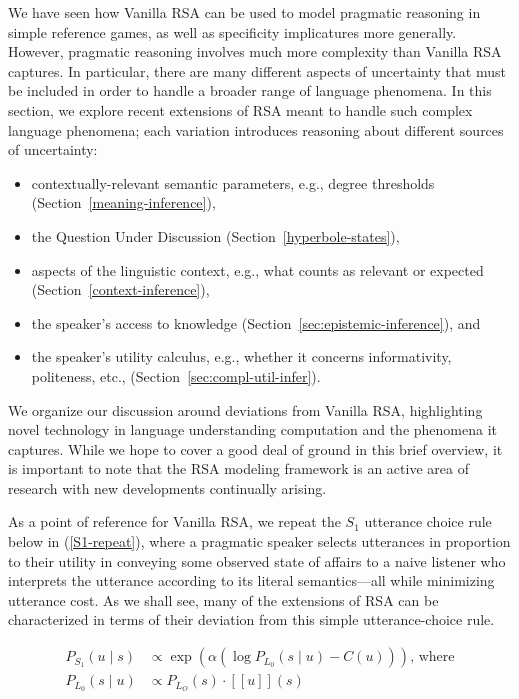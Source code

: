 \documentclass{sp}
\newcommand{\sem}[1]{\ensuremath{[\![#1]\!]}}
\begin{document}
We have seen how Vanilla RSA can be used to model pragmatic reasoning in simple reference games, as well as specificity implicatures more generally. However, pragmatic reasoning involves much more complexity than Vanilla RSA captures. In particular, there are many different aspects of uncertainty that must be included in order to handle a broader range of language phenomena. In this section, we explore recent extensions of RSA meant to handle such complex language phenomena; each variation introduces reasoning about different sources of uncertainty:
\begin{itemize}
  \item contextually-relevant semantic parameters, e.g., degree thresholds (Section~\ref{meaning-inference}),
  \item the Question Under Discussion (Section~\ref{hyperbole-states}),
  \item aspects of the linguistic context, e.g., what counts as relevant or expected (Section~\ref{context-inference}),
  \item the speaker's access to knowledge (Section~\ref{sec:epistemic-inference}), and
  \item the speaker's utility calculus, e.g., whether it concerns informativity, politeness, etc., (Section~\ref{sec:compl-util-infer}).
\end{itemize}
We organize our discussion around deviations from Vanilla RSA, highlighting novel technology in language understanding computation and the phenomena it captures. While we hope to cover a good deal of ground in this brief overview, it is important to note that the RSA modeling framework is an active area of research with new developments continually arising.

As a point of reference for Vanilla RSA, we repeat the $S_1$ utterance choice rule below in (\ref{S1-repeat}), where a pragmatic speaker selects utterances in proportion to their utility in conveying some observed state of affairs to a naive listener who interprets the utterance according to its literal semantics---all while minimizing utterance cost. As we shall see, many of the extensions of RSA can be characterized in terms of their deviation from this simple utterance-choice rule.

\begin{align} \label{S1-repeat}
  P_{S_1}(u\mid s) & \propto \exp (\alpha (\log P_{L_0}(s \mid u) - C(u))) \text{, where} \\
  P_{L_0}(s \mid u) & \propto P_{L_O}(s)  \cdot \sem{u}(s) \nonumber
\end{align}
\end{document}
